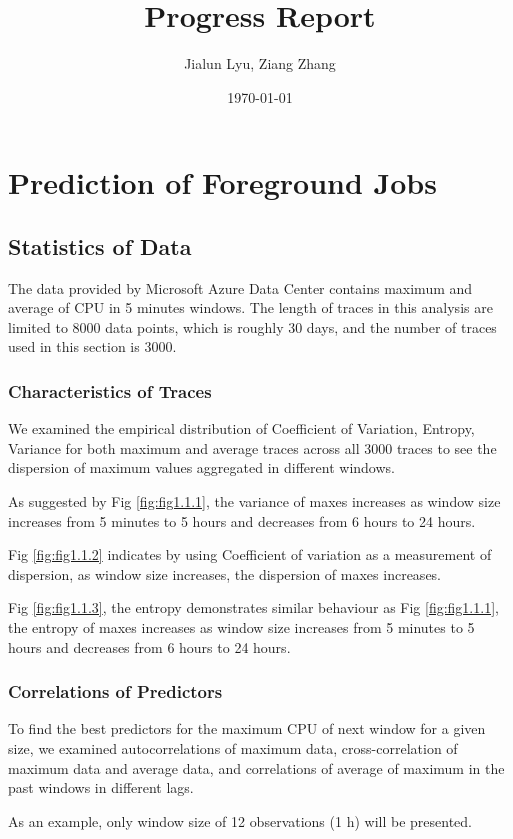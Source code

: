 \documentclass{article}
\title{Progress Report}
\author{Jialun Lyu, Ziang Zhang}
\date{\today}
\begin{document}
\maketitle

\section{Prediction of Foreground Jobs}

\subsection{Statistics of Data}

\begin{flushleft}
The data provided by Microsoft Azure Data Center contains maximum and average of
CPU in 5 minutes windows. The length of traces in this analysis are limited to
8000 data points, which is roughly 30 days, and the number of traces used in
this section is 3000. 
\end{flushleft}

\subsubsection{Characteristics of Traces}

\begin{flushleft}
We examined the empirical distribution of Coefficient of Variation, Entropy,
Variance for both maximum and average traces across all 3000 traces to see the
dispersion of maximum values aggregated in different windows.
\end{flushleft}


\begin{flushleft}
As suggested by Fig \ref{fig:fig1.1.1}, the variance of maxes increases as
window size increases from 5 minutes to 5 hours and decreases from 6 hours to 24
hours.

Fig \ref{fig:fig1.1.2} indicates by using Coefficient of variation as a
measurement of dispersion, as window size increases, the dispersion of maxes
increases.

Fig \ref{fig:fig1.1.3}, the entropy demonstrates similar behaviour as Fig
\ref{fig:fig1.1.1}, the entropy of maxes increases as window size increases from
5 minutes to 5 hours and decreases from 6 hours to 24 hours.
\end{flushleft}

\subsubsection{Correlations of Predictors}
\begin{flushleft}
To find the best predictors for the maximum CPU of next window for a given size,
we examined autocorrelations of maximum data, cross-correlation of maximum data
and average data, and correlations of average of maximum in the past windows in
different lags.

As an example, only window size of 12 observations (1 h) will be presented.
\end{flushleft}
\end{document}
